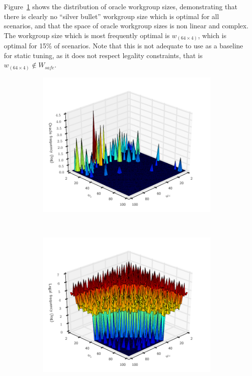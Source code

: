 \documentclass[nonatbib,preprint,10pt]{sigplanconf}
\begin{document}
Figure~\ref{fig:oracle-wgsizes} shows the distribution of oracle
workgroup sizes, demonstrating that there is clearly no ``silver
bullet'' workgroup size which is optimal for all scenarios, and that
the space of oracle workgroup sizes is non linear and complex. The
workgroup size which is most frequently optimal is
$w_{(64 \times 4)}$, which is optimal for 15\% of scenarios. Note that
this is not adequate to use as a baseline for static tuning, as it
does not respect legality constraints, that is
$w_{(64 \times 4)} \not\in W_{safe}$.

\begin{figure}
\begin{subfigure}[t]{0.98\columnwidth}
\centering
\includegraphics[width=\columnwidth]{img/oracle_param_space.pdf}
\vspace{-1.5em} %
\caption{}
\label{fig:oracle-wgsizes}
\end{subfigure}
\\
\begin{subfigure}[t]{0.98\columnwidth}
\centering
\includegraphics[width=\columnwidth]{img/coverage_space.pdf}

\end{subfigure}
\end{figure}
\end{document}
